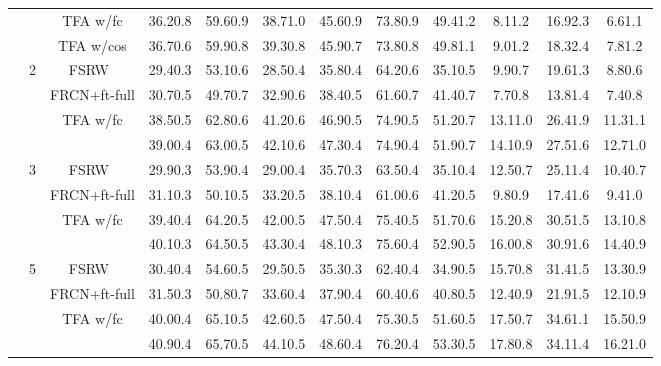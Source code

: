 \documentclass{article}
\newcommand{\model}{TFA\xspace}
\begin{document}
\begin{table*}[!h]
{\begin{tabular}{c|c|c|ccc|ccc|ccc}
    & & {\model w/fc} & 36.20.8 & 59.60.9 & 38.71.0 & 45.60.9 & 73.80.9 & 49.41.2 & 8.11.2 & 16.92.3 & 6.61.1  \\
    & &\cellcolor{Gray} {\model w/cos} & \cellcolor{Gray}36.70.6 &\cellcolor{Gray} 59.90.8 &\cellcolor{Gray} 39.30.8 &\cellcolor{Gray} 45.90.7 & \cellcolor{Gray}73.80.8 &\cellcolor{Gray} 49.81.1 & \cellcolor{Gray}9.01.2 & \cellcolor{Gray}18.32.4 &\cellcolor{Gray} 7.81.2 \\ \cmidrule{2-12}
    & \multirow{4}{*}{2} & FSRW~\cite{kang2019few} & 
    29.40.3&53.10.6&28.50.4&35.80.4&64.20.6&35.10.5&9.90.7&19.61.3&8.80.6 \\
    & & FRCN+ft-full & 30.70.5 & 49.70.7 & 32.90.6 & 38.40.5 & 61.60.7 & 41.40.7 & 7.70.8 & 13.81.4 & 7.40.8 \\
    & &{\model w/fc} & 38.50.5 & 62.80.6 & 41.20.6 & 46.90.5 & 74.90.5 & 51.20.7 & 13.11.0 & 26.41.9 & 11.31.1  \\
    & & \cellcolor{Gray}{\model w/cos} & \cellcolor{Gray}39.00.4 & \cellcolor{Gray}63.00.5 & \cellcolor{Gray}42.10.6 & \cellcolor{Gray}47.30.4 & \cellcolor{Gray}74.90.4 &\cellcolor{Gray} 51.90.7 &\cellcolor{Gray} 14.10.9 &\cellcolor{Gray} 27.51.6 &\cellcolor{Gray} 12.71.0  \\ \cmidrule{2-12}
    & \multirow{4}{*}{3} & FSRW~\cite{kang2019few} & 29.90.3&53.90.4&29.00.4&35.70.3&63.50.4&35.10.4&12.50.7&25.11.4&10.40.7 \\
    & & FRCN+ft-full & 31.10.3 & 50.10.5 & 33.20.5 & 38.10.4 & 61.00.6 & 41.20.5 & 9.80.9 & 17.41.6 & 9.41.0 \\
    & &{\model w/fc} & 39.40.4 & 64.20.5 & 42.00.5 & 47.50.4 & 75.40.5 & 51.70.6 & 15.20.8 & 30.51.5 & 13.10.8  \\
    & & \cellcolor{Gray}{\model w/cos} & \cellcolor{Gray}40.10.3 &\cellcolor{Gray} 64.50.5 &\cellcolor{Gray} 43.30.4 &\cellcolor{Gray} 48.10.3 & \cellcolor{Gray}75.60.4 & \cellcolor{Gray}52.90.5 & \cellcolor{Gray}16.00.8 & \cellcolor{Gray}30.91.6 & \cellcolor{Gray}14.40.9  \\ \cmidrule{2-12}
    & \multirow{4}{*}{5} & FSRW~\cite{kang2019few} & 30.40.4&54.60.5&29.50.5&35.30.3&62.40.4&34.90.5&15.70.8&31.41.5&13.30.9 \\
    & & FRCN+ft-full & 31.50.3 & 50.80.7 & 33.60.4 & 37.90.4 & 60.40.6 & 40.80.5 & 12.40.9 & 21.91.5 & 12.10.9 \\
    & &{\model w/fc} & 40.00.4 & 65.10.5 & 42.60.5 & 47.50.4 & 75.30.5 & 51.60.5 & 17.50.7 & 34.61.1 & 15.50.9  \\
    & & \cellcolor{Gray}{\model w/cos} & \cellcolor{Gray}40.90.4 & \cellcolor{Gray}65.70.5 & \cellcolor{Gray}44.10.5 & \cellcolor{Gray}48.60.4 &\cellcolor{Gray} 76.20.4 & \cellcolor{Gray}53.30.5 & \cellcolor{Gray}17.80.8 &\cellcolor{Gray} 34.11.4 & \cellcolor{Gray}16.21.0  \\ \cmidrule{2-12}

\end{tabular}}
\end{table*}
\end{document}
